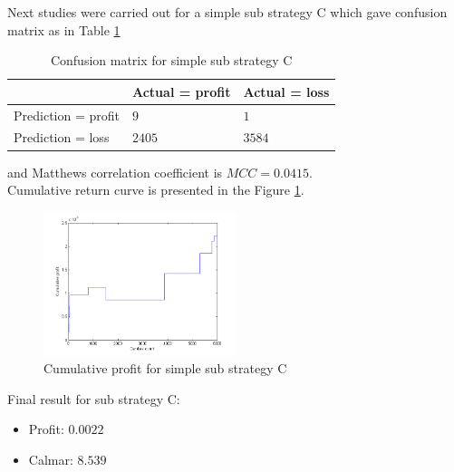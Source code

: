 \documentclass{jtacs}
\begin{document}
Next studies were carried out for a simple sub strategy C which gave confusion matrix as in Table \ref{tab3}
\begin{table}[ht]
\centering
\caption{Confusion matrix for simple sub strategy C}
\label{tab3}
\begin{tabular}{|l|l|l|}\hline
&	Actual = profit	& Actual = loss\\ \hline
Prediction = profit & $9$	& $1$ \\ \hline
Prediction = loss &	$2405$ &	$3584$ \\ \hline
\end{tabular}
\end{table}
\FloatBarrier
\noindent and Matthews correlation coefficient is $MCC=0.0415$.\\
Cumulative return curve is presented in the Figure \ref{rys5}.
\begin{figure}[ht]
\centering
\includegraphics[width = 0.5\textwidth]{pictures/PivotPointsCp.png}
\caption{Cumulative profit for simple sub strategy C}
\label{rys5}
\end{figure}
\FloatBarrier
\noindent Final result for sub strategy C:
\begin{itemize}
\item Profit: $0.0022$
\item Calmar: $8.539$
\end{itemize}
\end{document}
